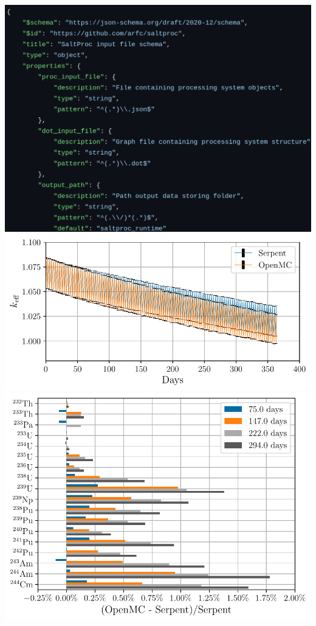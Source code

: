 \documentclass[a0paper,fleqn]{betterposter}
\begin{document}
{%

}{
\includegraphics[width=\textwidth]{img/json-schema.png}
\vspace{3cm}
\includegraphics[width=\textwidth]{img/keff.pdf}
\vspace{3cm}
\includegraphics[width=\textwidth]{img/actinides.pdf}
}
\end{document}

